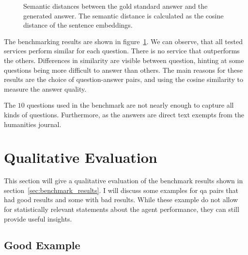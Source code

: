 \documentclass[../main.tex]{subfiles}
\begin{document}
\begin{figure}[ht]
      \caption{Semantic distances between the gold standard answer and the generated answer.
            The semantic distance is calculated as the cosine distance of the sentence embeddings.}
      \label{fig:benchmark_results}
\end{figure}

The benchmarking results are shown in figure~\ref{fig:benchmark_results}.
We can observe, that all tested services perform similar for each question.
There is no service that outperforms the others.
Differences in similarity are visible between question, hinting at some questions being
more difficult to answer than others.
The main reasons for these results are the choice of question-answer pairs, and using the
cosine similarity to measure the answer quality.

The $10$ questions used in the benchmark are not nearly enough to capture all
kinds of questions.
Furthermore, as the answers are direct text exempts from the humanities journal.



\section{Qualitative Evaluation}
\label{sec:subjective_evaluation}

This section will give a qualitative evaluation of the benchmark results shown
in section~\ref{sec:benchmark_results}.
I will discuss some examples for \gls{qa} pairs that had good results and some
with bad results.
While these example do not allow for statistically relevant statements about
the agent performance, they can still provide useful insights.

\subsection{Good Example}
\end{document}
